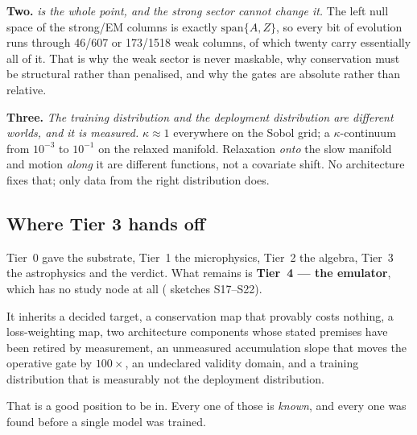 \textbf{Two.} \emph{\Ye{} is the whole point, and the strong sector cannot
change it.} The left null space of the strong/EM columns is exactly
$\mathrm{span}\{A, Z\}$, so every bit of \Ye{} evolution runs through 46/607
or 173/1518 weak columns, of which twenty carry essentially all of it. That is
why the weak sector is never maskable, why conservation must be structural
rather than penalised, and why the gates are absolute rather than relative.

\textbf{Three.} \emph{The training distribution and the deployment
distribution are different worlds, and it is measured.} $\kappa \approx 1$
everywhere on the Sobol grid; a $\kappa$-continuum from $10^{-3}$ to
$10^{-1}$ on the relaxed manifold. Relaxation \emph{onto} the slow manifold
and motion \emph{along} it are different functions, not a covariate shift. No
architecture fixes that; only data from the right distribution does.

\subsection{Where Tier 3 hands off}
\label{sec:handsoff}

Tier~0 gave the substrate, Tier~1 the microphysics, Tier~2 the algebra,
Tier~3 the astrophysics and the verdict. What remains is \textbf{Tier~4 ---
the emulator}, which has no study node at all ( sketches
S17--S22).

It inherits a decided target, a conservation map that provably costs nothing,
a loss-weighting map, two architecture components whose stated premises have
been retired by measurement, an unmeasured accumulation slope that moves the
operative gate by $100\times$, an undeclared validity domain, and a training
distribution that is measurably not the deployment distribution.

That is a good position to be in. Every one of those is \emph{known}, and
every one was found before a single model was trained.

